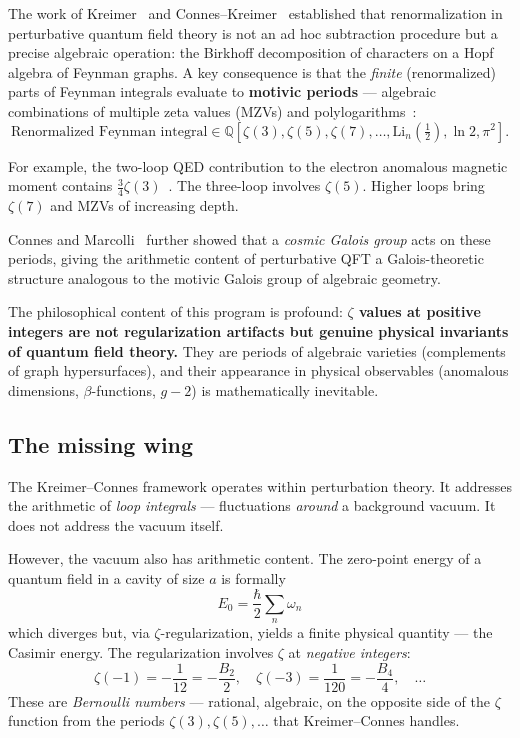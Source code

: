 \documentclass[11pt,a4paper]{article}
\begin{document}
The work of Kreimer~\cite{Kreimer1998} and
Connes--Kreimer~\cite{CK1998,CK2000,CK2001} established that
renormalization in perturbative quantum field theory is not an
ad hoc subtraction procedure but a precise algebraic operation:
the Birkhoff decomposition of characters on a Hopf algebra of
Feynman graphs. A key consequence is that the \emph{finite}
(renormalized) parts of Feynman integrals evaluate to
\textbf{motivic periods} --- algebraic combinations of multiple
zeta values (MZVs) and
polylogarithms~\cite{Brown2015,BrownKreimer2013}:
\begin{equation}
\text{Renormalized Feynman integral} \in
\mathbb{Q}[\zeta(3), \zeta(5), \zeta(7), \ldots, \mathrm{Li}_n(\tfrac{1}{2}), \ln 2, \pi^2].
\end{equation}

For example, the two-loop QED contribution to the electron
anomalous magnetic moment contains
$\frac{3}{4}\zeta(3)$~\cite{Laporta2017}. The three-loop involves
$\zeta(5)$. Higher loops bring $\zeta(7)$ and MZVs of increasing
depth.

Connes and Marcolli~\cite{ConnesMarcolli2008} further showed that
a \emph{cosmic Galois group} acts on these periods, giving the
arithmetic content of perturbative QFT a Galois-theoretic structure
analogous to the motivic Galois group of algebraic geometry.

The philosophical content of this program is profound:
\textbf{$\zeta$ values at positive integers are not regularization
artifacts but genuine physical invariants of quantum field theory.}
They are periods of algebraic varieties (complements of graph
hypersurfaces), and their appearance in physical observables
(anomalous dimensions, $\beta$-functions, $g-2$) is
mathematically inevitable.

\subsection{The missing wing}

The Kreimer--Connes framework operates within perturbation theory.
It addresses the arithmetic of \emph{loop integrals} --- fluctuations
\emph{around} a background vacuum. It does not address the vacuum
itself.

However, the vacuum also has arithmetic content. The zero-point
energy of a quantum field in a cavity of size $a$ is formally
\begin{equation}\label{eq:zpe}
E_0 = \frac{\hbar}{2}\sum_n \omega_n
\end{equation}
which diverges but, via $\zeta$-regularization, yields a finite
physical quantity --- the Casimir energy. The regularization involves
$\zeta$ at \emph{negative integers}:
\begin{equation}
\zeta(-1) = -\frac{1}{12} = -\frac{B_2}{2}, \quad
\zeta(-3) = \frac{1}{120} = -\frac{B_4}{4}, \quad \ldots
\end{equation}
These are \emph{Bernoulli numbers} --- rational, algebraic, on the
opposite side of the $\zeta$ function from the periods $\zeta(3),
\zeta(5), \ldots$ that Kreimer--Connes handles.
\end{document}
